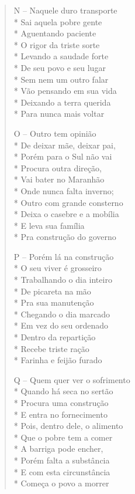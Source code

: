 \begin{verse}
N -- Naquele duro transporte\\*
Sai aquela pobre gente\\*
Aguentando paciente\\*
O rigor da triste sorte\\*
Levando a saudade forte\\*
De seu povo e seu lugar\\*
Sem nem um outro falar\\*
Vão pensando em sua vida\\*
Deixando a terra querida\\*
Para nunca mais voltar

O -- Outro tem opinião\\*
De deixar mãe, deixar pai,\\*
Porém para o Sul não vai\\*
Procura outra direção,\\*
Vai bater no Maranhão\\*
Onde nunca falta inverno;\\*
Outro com grande consterno\\*
Deixa o casebre e a mobília\\*
E leva sua família\\*
Pra construção do governo

P -- Porém lá na construção\\*
O seu viver é grosseiro\\*
Trabalhando o dia inteiro\\*
De picareta na mão\\*
Pra sua manutenção\\*
Chegando o dia marcado\\*
Em vez do seu ordenado\\*
Dentro da repartição\\*
Recebe triste ração\\*
Farinha e feijão furado

Q -- Quem quer ver o sofrimento\\*
Quando há seca no sertão\\*
Procura uma construção\\*
E entra no fornecimento\\*
Pois, dentro dele, o alimento\\*
Que o pobre tem a comer\\*
A barriga pode encher,\\*
Porém falta a substância\\*
E com esta circunstância\\*
Começa o povo a morrer


\end{verse}
